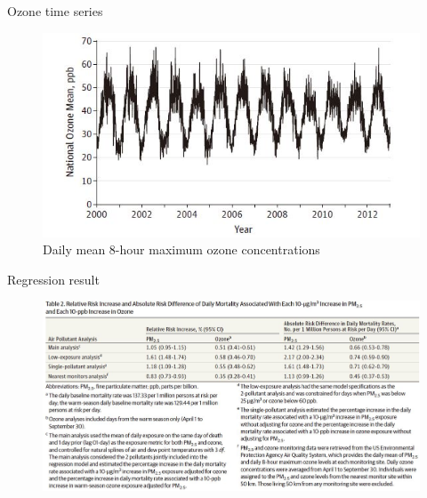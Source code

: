 \documentclass[ignorenonframetext,]{beamer}
\begin{document}
\begin{frame}{Ozone time series}

\begin{figure}
\centering
\includegraphics{p3.JPG}
\caption{Daily mean 8-hour maximum ozone concentrations}
\end{figure}

\end{frame}

\begin{frame}{Regression result}

\begin{figure}
\centering
\includegraphics{p4.JPG}
\caption{}
\end{figure}

\end{frame}
\end{document}
